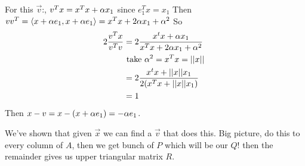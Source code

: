 For this $\vec v$:, $v^Tx = x^Tx +\alpha x_1$ since $e_1^Tx = x_1$
Then $vv^T = \langle x+\alpha e_1, x+\alpha e_1 \rangle = x^Tx + 2\alpha x_1 + \alpha^2$
So 
\begin{align*}
2\frac{v^Tx}{v^Tv} &= 2\frac{x^tx+\alpha x_1}{x^Tx + 2\alpha x_1 + \alpha^2}\\
&\text{ take $\alpha^2=x^Tx = ||x||$ }\\
&=2\frac{x^tx+||x|| x_1}{2(x^Tx + ||x||x_1)}\\
&=1
\end{align*}
Then $x-v = x - (x+\alpha e_1) = -\alpha e_1$.

We've shown that given $\vec x$ we can find a $\vec v$ that does this.
Big picture, do this to every column of $A$, then we get bunch of $P$
which will be our $Q$! then the remainder gives us upper triangular
matrix $R$. 

